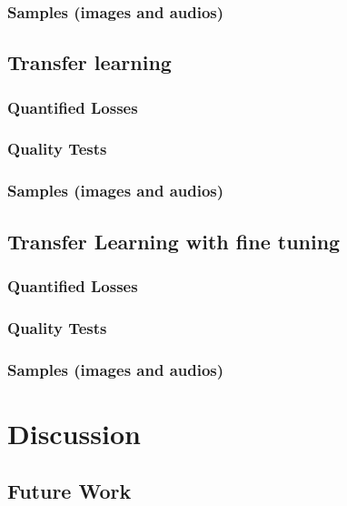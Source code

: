\documentclass{book}
\begin{document}
    \subsection{Samples (images and audios)}
  \section{Transfer learning}
    \subsection{Quantified Losses}
    \subsection{Quality Tests}
    \subsection{Samples (images and audios)}
  \section{Transfer Learning with fine tuning}
    \subsection{Quantified Losses}
    \subsection{Quality Tests}
    \subsection{Samples (images and audios)}

\chapter{Discussion}
  \section{Future Work}
\end{document}
